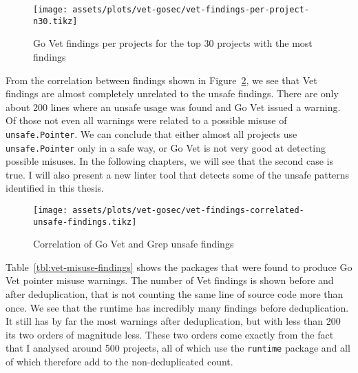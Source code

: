 \begin{figure}[ht]
    \centering
    {\scriptsize \texttt{[image: assets/plots/vet-gosec/vet-findings-per-project-n30.tikz]}}
    \caption{Go Vet findings per projects for the top 30 projects with the most findings}
    \label{fig:vet-findings-per-project-n30}
\end{figure}

From the correlation between findings shown in Figure~\ref{fig:correlation-vet-grep-findings}, we see that Vet findings
are almost completely unrelated to the unsafe findings.
There are only about 200 lines where an unsafe usage was found and Go Vet issued a warning.
Of those not even all warnings were related to a possible misuse of \texttt{unsafe.Pointer}.
We can conclude that either almost all projects use \texttt{unsafe.Pointer} only in a safe way, or Go Vet is not very
good at detecting possible misuses.
In the following chapters, we will see that the second case is true.
I will also present a new linter tool that detects some of the unsafe patterns identified in this thesis.

\begin{figure}[ht]
    \centering
    {\scriptsize \texttt{[image: assets/plots/vet-gosec/vet-findings-correlated-unsafe-findings.tikz]}}
    \caption{Correlation of Go Vet and Grep unsafe findings}
    \label{fig:correlation-vet-grep-findings}
\end{figure}

Table~\ref{tbl:vet-misuse-findings} shows the packages that were found to produce Go Vet pointer misuse warnings.
The number of Vet findings is shown before and after deduplication, that is not counting the same line of source code
more than once.
We see that the runtime has incredibly many findings before deduplication.
It still has by far the most warnings after deduplication, but with less than 200 its two orders of magnitude less.
These two orders come exactly from the fact that I analysed around 500 projects, all of which use the \texttt{runtime}
package and all of which therefore add to the non-deduplicated count.

